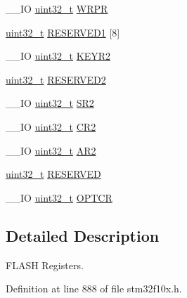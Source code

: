 \begin{DoxyCompactItemize}
\item 
\-\_\-\-\_\-\-I\-O \hyperlink{stdint_8h_a435d1572bf3f880d55459d9805097f62}{uint32\-\_\-t} \hyperlink{struct_f_l_a_s_h___type_def_ac1889c0e17d868ab991f267ceb9dbb4b}{W\-R\-P\-R}
\item 
\hyperlink{stdint_8h_a435d1572bf3f880d55459d9805097f62}{uint32\-\_\-t} \hyperlink{struct_f_l_a_s_h___type_def_a6b72761900a107781af2d902f60f34b3}{R\-E\-S\-E\-R\-V\-E\-D1} \mbox{[}8\mbox{]}
\item 
\-\_\-\-\_\-\-I\-O \hyperlink{stdint_8h_a435d1572bf3f880d55459d9805097f62}{uint32\-\_\-t} \hyperlink{struct_f_l_a_s_h___type_def_a4c26c83fce5b3ede2109127756559371}{K\-E\-Y\-R2}
\item 
\hyperlink{stdint_8h_a435d1572bf3f880d55459d9805097f62}{uint32\-\_\-t} \hyperlink{struct_f_l_a_s_h___type_def_a23ed73264a5196d6bfb9f8769797f29c}{R\-E\-S\-E\-R\-V\-E\-D2}
\item 
\-\_\-\-\_\-\-I\-O \hyperlink{stdint_8h_a435d1572bf3f880d55459d9805097f62}{uint32\-\_\-t} \hyperlink{struct_f_l_a_s_h___type_def_ad697c10f0b4c43b943d09bc2b324592f}{S\-R2}
\item 
\-\_\-\-\_\-\-I\-O \hyperlink{stdint_8h_a435d1572bf3f880d55459d9805097f62}{uint32\-\_\-t} \hyperlink{struct_f_l_a_s_h___type_def_a47c104621ec5af2bca07089c527ada3d}{C\-R2}
\item 
\-\_\-\-\_\-\-I\-O \hyperlink{stdint_8h_a435d1572bf3f880d55459d9805097f62}{uint32\-\_\-t} \hyperlink{struct_f_l_a_s_h___type_def_af7502255ac67c0c60dae12cf24b525cd}{A\-R2}
\item 
\hyperlink{stdint_8h_a435d1572bf3f880d55459d9805097f62}{uint32\-\_\-t} \hyperlink{struct_f_l_a_s_h___type_def_a0fcd52ab6fff5b2e6843ad029509913a}{R\-E\-S\-E\-R\-V\-E\-D}
\item 
\-\_\-\-\_\-\-I\-O \hyperlink{stdint_8h_a435d1572bf3f880d55459d9805097f62}{uint32\-\_\-t} \hyperlink{struct_f_l_a_s_h___type_def_a54026c3b5bc2059f1b187acb6c4817ac}{O\-P\-T\-C\-R}
\end{DoxyCompactItemize}


\subsection{Detailed Description}
F\-L\-A\-S\-H Registers. 

Definition at line 888 of file stm32f10x.\-h.



